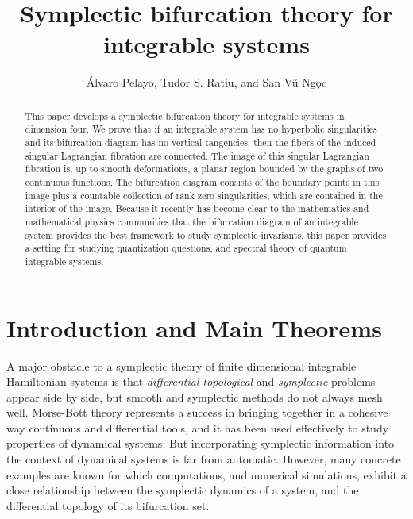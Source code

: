 \documentclass[11pt]{article}
\begin{document}
\title{{\bf Symplectic bifurcation theory for integrable systems}}

\author{\'Alvaro Pelayo, Tudor S. Ratiu, and San V\~{u} Ng\d{o}c}

\date{}

\maketitle

 



\begin{abstract}
  This paper develops a symplectic bifurcation theory for integrable
  systems in dimension four.  We prove that if an integrable system
  has no hyperbolic singularities and its bifurcation diagram has no
  vertical tangencies, then the fibers of the induced singular Lagrangian
  fibration are connected. The image of this
  singular Lagrangian fibration is, up to smooth deformations, a planar region bounded by
  the graphs of two continuous functions. The bifurcation diagram consists
  of the boundary points in this image  plus a countable
  collection of  rank zero singularities, which are contained in the
  interior of the image.   Because it recently has
  become clear to the mathematics and mathematical physics communities
  that the bifurcation diagram of an integrable system provides the
  best framework to study symplectic invariants, 
  this paper provides a setting for studying quantization questions, and
  spectral theory of quantum integrable systems.
  \end{abstract}


\section{Introduction and Main Theorems} \label{sec:intro} 


A major
obstacle to a symplectic theory of finite dimensional integrable
Hamiltonian systems is that \emph{differential topological} and
\emph{symplectic} problems appear side by side, but smooth and
symplectic methods do not always mesh well. Morse-Bott theory
represents a success in bringing together in a cohesive way continuous
and differential tools, and it has been used effectively to study
properties of dynamical systems. But incorporating symplectic
information into the context of dynamical systems is far from
automatic. However, many concrete examples are known for which
computations, and numerical simulations, exhibit a close relationship
between the symplectic dynamics of a system, and the differential
topology of its bifurcation set. 
\end{document}
